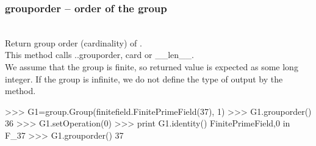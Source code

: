   \subsubsection{grouporder -- order of the group}
   \\
   \spacing
   \quad Return group order (cardinality) of .\\
   \spacing
   \quad \negok This method calls ..grouporder, card or \_\_len\_\_.\\
   We assume that the group is finite, so returned value is expected as some long integer.
   If the group is infinite, we do not define the type of output by the method.
   \spacing
\begin{ex}
>>> G1=group.Group(finitefield.FinitePrimeField(37), 1)
>>> G1.grouporder()
36
>>> G1.setOperation(0)
>>> print G1.identity()
FinitePrimeField,0 in F_37
>>> G1.grouporder()
37
\end{ex}%
\C

